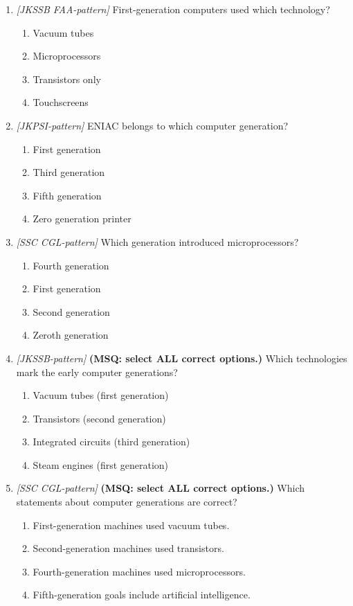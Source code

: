 \documentclass[11pt]{article}
\begin{document}
\begin{enumerate}[label=\textbf{Q\arabic*.}, leftmargin=*]
\item \textit{[JKSSB FAA-pattern]} First-generation computers used which technology?
  \begin{enumerate}[label=\Alph*.]
    \item Vacuum tubes
    \item Microprocessors
    \item Transistors only
    \item Touchscreens
  \end{enumerate}
\item \textit{[JKPSI-pattern]} ENIAC belongs to which computer generation?
  \begin{enumerate}[label=\Alph*.]
    \item First generation
    \item Third generation
    \item Fifth generation
    \item Zero generation printer
  \end{enumerate}
\item \textit{[SSC CGL-pattern]} Which generation introduced microprocessors?
  \begin{enumerate}[label=\Alph*.]
    \item Fourth generation
    \item First generation
    \item Second generation
    \item Zeroth generation
  \end{enumerate}
\item \textit{[JKSSB-pattern]} \textbf{(MSQ: select ALL correct options.)} Which technologies mark the early computer generations?
  \begin{enumerate}[label=\Alph*.]
    \item Vacuum tubes (first generation)
    \item Transistors (second generation)
    \item Integrated circuits (third generation)
    \item Steam engines (first generation)
  \end{enumerate}
\item \textit{[SSC CGL-pattern]} \textbf{(MSQ: select ALL correct options.)} Which statements about computer generations are correct?
  \begin{enumerate}[label=\Alph*.]
    \item First-generation machines used vacuum tubes.
    \item Second-generation machines used transistors.
    \item Fourth-generation machines used microprocessors.
    \item Fifth-generation goals include artificial intelligence.
  \end{enumerate}
\end{enumerate}
\def\JKSSBLessonID{49}\def\JKSSBAnswers{0}
\end{document}
